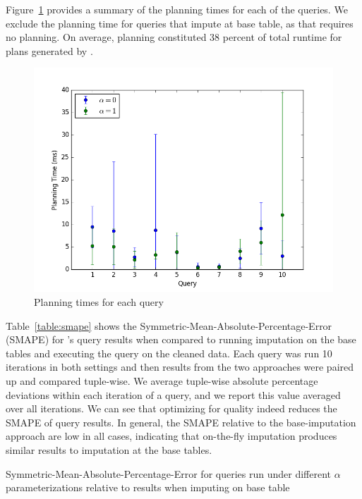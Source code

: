 Figure~\ref{fig:plantimes} provides a summary of the planning times for each of the queries.  We exclude the planning time for queries that impute at base table, as that
requires no planning. On average, planning constituted 38 percent of total runtime for plans generated by \ProjectName{}.

\begin{figure}
\includegraphics[width=\columnwidth]{figures/planning_times_imputedb.png}
\caption{Planning times for each query}
\label{fig:plantimes}
\end{figure}

Table~\ref{table:smape} shows the Symmetric-Mean-Absolute-Percentage-Error (SMAPE) for \ProjectName{}'s query results when compared to 
running imputation on the base tables and executing the query on the
cleaned data. Each query was run 10 %
iterations in both settings and then results from the two approaches were paired up and compared tuple-wise. We average tuple-wise
absolute percentage deviations within each iteration of a query, and we report this value averaged over all iterations.
We can see that optimizing for quality indeed reduces the SMAPE of query results. In general, the SMAPE relative to the
base-imputation approach are low in all cases, indicating that on-the-fly imputation produces similar results to
imputation at the base tables.

\begin{table}
\centering

\caption{Symmetric-Mean-Absolute-Percentage-Error for queries run under different $\alpha$ parameterizations relative to results when imputing on base table}
\label{table:smape}
\end{table}

